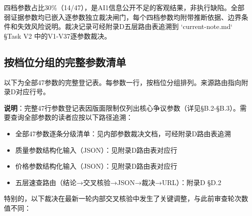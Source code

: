 四档参数占比30\%（14/47），是AI1信息公开不足的客观结果，非执行缺陷。全部弱证据参数均已嵌入逐参数独立裁决闸门，每个四档参数均附带推断依据、边界条件和失效风险说明。裁决记录可经附录D五层路由表追溯到 `current-note.md` §Task V2 中的V1-V37逐参数裁决。

\subsection{按档位分组的完整参数清单}

以下为全部47参数的完整登记表。每参数一行，按档位分组排列。来源路由指向附录D对应行号。

\textbf{说明}：完整47行参数登记表因版面限制仅列出核心争议参数（详见§B.2-§B.3）。需要查询全部参数的读者应按以下路径追溯：

\begin{itemize}
  \item 全部47参数逐条分级清单：见内部参数裁决文档，可经附录D路由表追溯
  \item 质量参数结构化输入（JSON）：见附录D路由表对应行
  \item 价格参数结构化输入（JSON）：见附录D路由表对应行
  \item 五层速查路由（结论→交叉核验→JSON→裁决→URL）：附录D §D.2
\end{itemize}

特别的，以下裁决在最新一轮内部交叉核验中发生了关键调整，与此前审查轮次数值不同：

